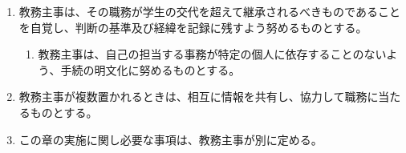 \begin{enumerate}[label=第\arabic*条　]
    \begin{enumerate}[label=\arabic*　,start=2,leftmargin=*]
      \item 教務主事は、学生の権利利益に影響を及ぼす判断を行ったときは、当該学生に対し、その理由を明らかにするものとする。
    \end{enumerate}
  \item 教務主事は、その職務が学生の交代を超えて継承されるべきものであることを自覚し、判断の基準及び経緯を記録に残すよう努めるものとする。
    \begin{enumerate}[label=\arabic*　,start=2,leftmargin=*]
      \item 教務主事は、自己の担当する事務が特定の個人に依存することのないよう、手続の明文化に努めるものとする。
    \end{enumerate}
  \item 教務主事が複数置かれるときは、相互に情報を共有し、協力して職務に当たるものとする。
  \item この章の実施に関し必要な事項は、教務主事が別に定める。
\end{enumerate}
